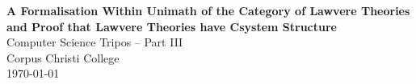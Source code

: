 \documentclass[12pt,a4paper,twoside,openany]{report}
\begin{document}
\pagestyle{empty}
\begin{titlepage}
    \begin{center}
        \vspace*{60mm}
        \Huge \textbf{A Formalisation Within Unimath of the Category of Lawvere
        Theories and Proof that Lawvere Theories have Csystem Structure} \\
        \vspace{5mm}
        Computer Science Tripos -- Part III \\
        \vspace{5mm}
        Corpus Christi College \\
        \vspace{5mm}
        \today
    \end{center}
\end{titlepage}
\tableofcontents
\pagestyle{plain}
\listoffigures

\pagestyle{headings}


\end{document}
